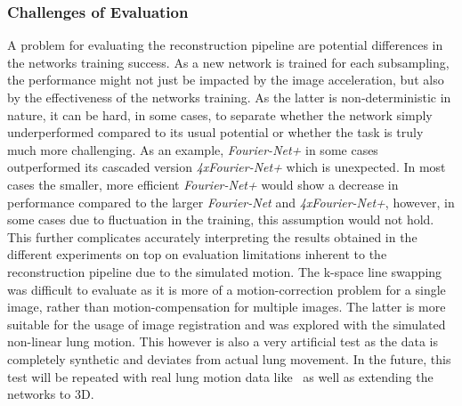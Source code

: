 \subsubsection{Challenges of Evaluation} \label{SubSubSec:ChallengesEvaluation}
A problem for evaluating the reconstruction pipeline are potential differences in the networks training success. As a new network is trained for each subsampling, the performance might not just be impacted by the image acceleration, but also by the effectiveness of the networks training. As the latter is non-deterministic in nature, it can be hard, in some cases, to separate whether the network simply underperformed compared to its usual potential or whether the task is truly much more challenging. As an example, \emph{Fourier-Net+} in some cases outperformed its cascaded version \emph{4xFourier-Net+} which is unexpected. In most cases the smaller, more efficient \emph{Fourier-Net+} would show a decrease in performance compared to the larger \emph{Fourier-Net} and \emph{4xFourier-Net+}, however, in some cases due to fluctuation in the training, this assumption would not hold. This further complicates accurately interpreting the results obtained in the different experiments on top on evaluation limitations inherent to the reconstruction pipeline due to the simulated motion. The k-space line swapping was difficult to evaluate as it is more of a motion-correction problem for a single image, rather than motion-compensation for multiple images. The latter is more suitable for the usage of image registration and was explored with the simulated non-linear lung motion. This however is also a very artificial test as the data is completely synthetic and deviates from actual lung movement. In the future, this test will be repeated with real lung motion data like~\cite{DataLungMotoin} as well as extending the networks to 3D.
